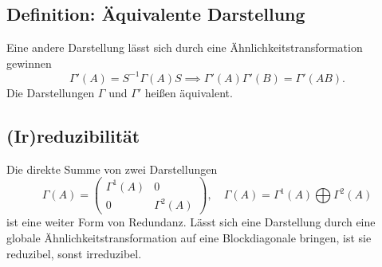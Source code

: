 \documentclass[
  captions=tableheading,  %
  titlepage=firstiscover, %
]{scrartcl}
\begin{document}
\subsection{Definition: Äquivalente Darstellung}
Eine andere Darstellung lässt sich durch eine Ähnlichkeitstransformation gewinnen
\begin{equation*}
  \Gamma'(A) = S^{-1} \Gamma (A) S \implies \Gamma'(A) \Gamma'(B) = \Gamma'(AB).
\end{equation*}
Die Darstellungen $\Gamma$ und $\Gamma'$ heißen äquivalent.
\subsection{(Ir)reduzibilität}
Die direkte Summe von zwei Darstellungen 
\begin{equation*}
  \Gamma (A) = 
  \begin{pmatrix}
    \Gamma^1 (A)  & 0           \\
    0             & \Gamma^2(A)
  \end{pmatrix}
  , \quad \Gamma (A) = \Gamma^1 (A)\bigoplus \Gamma^2(A)
\end{equation*}
ist eine weiter Form von Redundanz.
Lässt sich eine Darstellung durch eine globale Ähnlichkeitstransformation auf eine Blockdiagonale
bringen, ist sie reduzibel, sonst irreduzibel.
\end{document}
